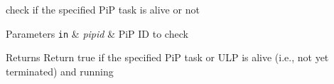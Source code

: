 check if the specified Pi\-P task is alive or not 


\begin{DoxyParams}[1]{Parameters}
\mbox{\tt in}  & {\em pipid} & Pi\-P I\-D to check\\
\hline
\end{DoxyParams}
\begin{DoxyReturn}{Returns}
Return true if the specified Pi\-P task or U\-L\-P is alive (i.\-e., not yet terminated) and running 
\end{DoxyReturn}
